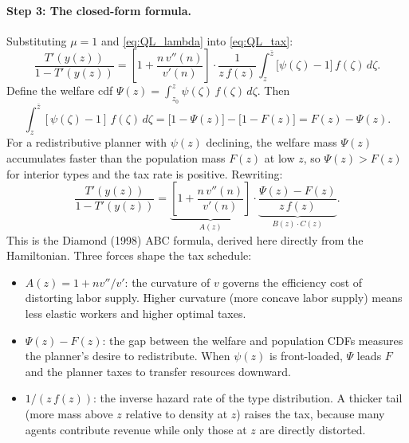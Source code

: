 \documentclass[12pt,a4paper]{article}
\theoremstyle{definition}
\theoremstyle{plain}
\theoremstyle{remark}
\newcommand{\zbar}{\bar{z}}
\newcommand{\zlow}{z_{\scriptscriptstyle 0}}
\begin{document}
\paragraph{Step 3: The closed-form formula.}
Substituting $\mu = 1$ and \eqref{eq:QL_lambda} into \eqref{eq:QL_tax}:
\begin{equation}
\label{eq:QL_tax_closed}
  \frac{T'(y(z))}{1 - T'(y(z))} = \left[1 + \frac{n\, v''(n)}{v'(n)}\right] \cdot \frac{1}{z\, f(z)}
    \int_{z}^{\zbar} \bigl[\psi(\zeta) - 1\bigr]\, f(\zeta)\, d\zeta.
\end{equation}
Define the welfare cdf $\Psi(z) = \int_{\zlow}^{z} \psi(\zeta)\, f(\zeta)\, d\zeta$. Then
\[
  \int_{z}^{\zbar} [\psi(\zeta) - 1]\, f(\zeta)\, d\zeta
  = \bigl[1 - \Psi(z)\bigr] - \bigl[1 - F(z)\bigr]
  = F(z) - \Psi(z).
\]
For a redistributive planner with $\psi(z)$ declining, the welfare mass $\Psi(z)$ accumulates faster than the population mass $F(z)$ at low $z$, so $\Psi(z) > F(z)$ for interior types and the tax rate is positive. Rewriting:
\begin{equation}
\label{eq:QL_ABC}
  \boxed{
  \frac{T'(y(z))}{1 - T'(y(z))} =
  \underbrace{\left[1 + \frac{n\, v''(n)}{v'(n)}\right]}_{A(z)}
  \cdot
  \underbrace{\frac{\Psi(z) - F(z)}{z\, f(z)}}_{B(z) \cdot C(z)}.
  }
\end{equation}
This is the Diamond (1998) ABC formula, derived here directly from the Hamiltonian. Three forces shape the tax schedule:
\begin{itemize}[leftmargin=2em]
  \item $A(z) = 1 + nv''/v'$: the curvature of $v$ governs the efficiency cost of distorting labor supply. Higher curvature (more concave labor supply) means less elastic workers and higher optimal taxes.
  \item $\Psi(z) - F(z)$: the gap between the welfare and population CDFs measures the planner's desire to redistribute. When $\psi(z)$ is front-loaded, $\Psi$ leads $F$ and the planner taxes to transfer resources downward.
  \item $1/(z\,f(z))$: the inverse hazard rate of the type distribution. A thicker tail (more mass above $z$ relative to density at $z$) raises the tax, because many agents contribute revenue while only those at $z$ are directly distorted.
\end{itemize}
\end{document}

